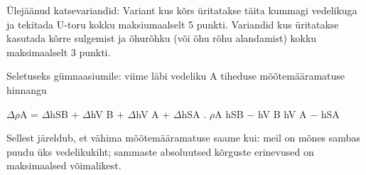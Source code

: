 Ülejäänud katsevariandid: Variant kus kõrs üritatakse täita kummagi vedelikuga ja tekitada U-toru kokku maksiumaalselt 5 punkti. Variandid kus üritatakse kasutada kõrre sulgemist ja õhurõhku (või õhu rõhu alandamist) kokku maksimaalselt 3 punkti.

Seletuseks gümnaasiumile: viime läbi vedeliku A tiheduse mõõtemääramatuse hinnangu

$\Delta\rho$A = $\Delta$hSB + $\Delta$hV B + $\Delta$hV A + $\Delta$hSA . $\rho$A hSB $-$ hV B hV A $-$ hSA

Sellest järeldub, et vähima mõõtemääramatuse saame kui: meil on mõnes sambas puudu üks vedelikukiht; sammaste absoluutsed kõrguste erinevused on maksimaalsed võimalikest.
\probend
